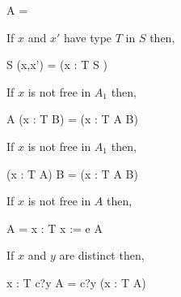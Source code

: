 \begin{law}
  \label{seq-zerol-law}
  \begin{circus}
    \Chaos \circseq A = \Chaos
  \end{circus}
\end{law}

\begin{law}
  \label{schema-hide-var-conv-law}
  If $x$ and $x'$ have type $T$ in $S$ then,
  \begin{circus}
    \lschexpract S \hide (x,x') \rschexpract
    =
    (\circvar x : T \circspot \lschexpract S \rschexpract)
  \end{circus}
\end{law}
  
\begin{law}
  \label{var-seq-extl-law}
  If $x$ is not free in $A_1$ then,
  \begin{circus}
    A \circseq (\circvar x : T \circspot B)
    =
    (\circvar x : T \circspot A \circseq B)
  \end{circus}
\end{law}

\begin{law}
  \label{var-seq-extr-law}
  If $x$ is not free in $A_1$ then,
  \begin{circus}
    (\circvar x : T \circspot A) \circseq B
    =
    (\circvar x : T \circspot A \circseq B)
  \end{circus}
\end{law}

\begin{law}
  \label{var-assign-intro-law}
  If $x$ is not free in $A$ then,
  \begin{circus}
    A
    =
    \circvar x : T \circspot x := e \circseq A
  \end{circus}
\end{law}

\begin{law}
  \label{input-prefix-var-ext-law}
  If $x$ and $y$ are distinct then,
  \begin{circus}
    \circvar x : T \circspot c?y \then A
    =
    c?y \then (\circvar x : T \circspot A)
  \end{circus}
\end{law}

